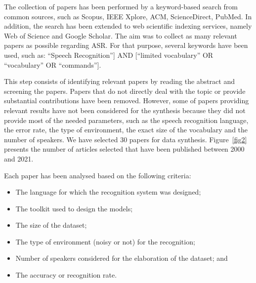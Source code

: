 The collection of papers has been performed by a keyword-based search from common sources, such as Scopus, IEEE Xplore, ACM, ScienceDirect, PubMed. In addition, the search has been extended to web scientific indexing services, namely Web of Science and Google Scholar.  The aim was to collect as many relevant papers as possible regarding ASR.  For that purpose, several keywords have been used, such as:  “Speech Recognition”] AND [“limited vocabulary” OR “vocabulary” OR “commands”].

This step consists of identifying relevant papers by reading the abstract and screening the papers. Papers that do not directly deal with the topic or provide substantial contributions have been removed. 
However, some of papers providing relevant results have not been considered for the synthesis because they did not provide most of the needed parameters, such as the speech recognition language, the error rate, the type of environment, the exact size of the vocabulary and the number of speakers. We have selected 30 papers for data synthesis. Figure~\ref{fig2} presents the number of articles selected that have been published between 2000 and 2021.

Each paper has been analysed based on the following criteria:
\begin{itemize}
    \item The language for which the recognition system was designed;
    \item The toolkit used to design the models;
    \item The size of the dataset;
    \item The type of environment (noisy or not) for the recognition;
    \item Number of speakers considered for the elaboration of the dataset; and
    \item The accuracy or recognition rate.
\end{itemize}

